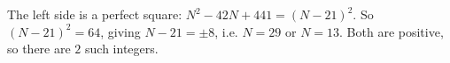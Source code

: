The left side is a perfect square: $N^2-42N+441=(N-21)^2$. So $(N-21)^2=64$, giving $N-21=\pm8$, i.e. $N=29$ or $N=13$. Both are positive, so there are $\boxed{2}$ such integers.
